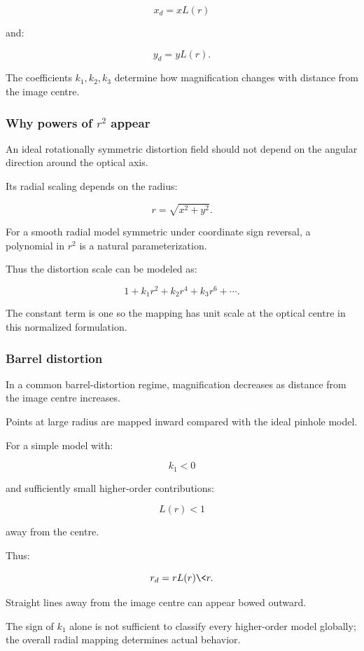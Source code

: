 \[
 \boxed{ x_d=xL(r) }
\]

and:

\[
 \boxed{ y_d=yL(r) }.
\]

The coefficients \(k_1,k_2,k_3\) determine how magnification changes with distance from the image centre.

\subsubsection{\texorpdfstring{Why powers of \(r^2\) appear}{Why powers of r\^{}2 appear}}\label{why-powers-of-r2-appear}

An ideal rotationally symmetric distortion field should not depend on the angular direction around the optical axis.

Its radial scaling depends on the radius:

\[
 r=\sqrt{x^2+y^2}.
\]

For a smooth radial model symmetric under coordinate sign reversal, a polynomial in \(r^2\) is a natural parameterization.

Thus the distortion scale can be modeled as:

\[
 1+k_1r^2+k_2r^4+k_3r^6+\cdots.
\]

The constant term is one so the mapping has unit scale at the optical centre in this normalized formulation.

\subsubsection{Barrel distortion}\label{barrel-distortion}

In a common barrel-distortion regime, magnification decreases as distance from the image centre increases.

Points at large radius are mapped inward compared with the ideal pinhole model.

For a simple model with:

\[
 k_1<0
\]

and sufficiently small higher-order contributions:

\[
 L(r)<1
\]

away from the centre.

Thus:

\[
 r_d=rL(r)\<r.
\]

Straight lines away from the image centre can appear bowed outward.

The sign of \(k_1\) alone is not sufficient to classify every higher-order model globally; the overall radial mapping determines actual behavior.

